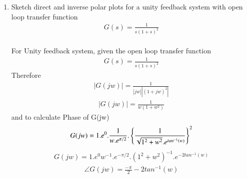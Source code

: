 \begin{enumerate}[label=\thesection.\arabic*.,ref=\thesection.\theenumi]
\item
Sketch direct and inverse polar plots for a unity feedback system with open loop transfer function
\begin{align}
G(s) = \frac{1}{s(1+s)^2}
\end{align}
\\
\solution  
For Unity feedback system, given the open loop transfer function
\begin{align}
G(s) = \frac{1}{s(1+s)^2}
\end{align}
Therefore 
\begin{align}
|G(jw)| = \frac{1}{|jw||(1+jw)^2|}  
\end{align}
\begin{align}
|G(jw)| = \frac{1}{w(1+w^2)}
\label{eq:mod_G}
\end{align}
and to calculate Phase of G(jw)
\begin{align}
G(jw) = 1.e^{0}.\frac{1}{w.e^{\pi/2}} . \left\{\frac{1}{\sqrt{1^2 + w^2} . e^{tan^{-1}(w)}}\right\}^2  
\end{align}
\begin{align}
G(jw) = 1.e^{0} w^{-1}.e^{-\pi/2}. (1^2 + w^2)^{-1} . e^{-2tan^{-1}(w)}  
\end{align}
\begin{align}
\angle G(jw) = \frac{-\pi}{2} - 2tan^{-1}(w)  
\label{eq:phase_G}
\end{align}


\end{enumerate}
